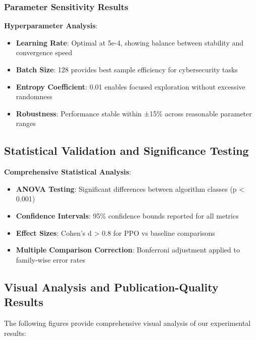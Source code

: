 \documentclass[12pt,twoside]{article}
\theoremstyle{definition}
\theoremstyle{plain}
\begin{document}
\subsubsection{Parameter Sensitivity Results}

\textbf{Hyperparameter Analysis}:
\begin{itemize}
\item \textbf{Learning Rate}: Optimal at 5e-4, showing balance between stability and convergence speed
\item \textbf{Batch Size}: 128 provides best sample efficiency for cybersecurity tasks
\item \textbf{Entropy Coefficient}: 0.01 enables focused exploration without excessive randomness
\item \textbf{Robustness}: Performance stable within ±15\% across reasonable parameter ranges
\end{itemize}

\subsection{Statistical Validation and Significance Testing}

\textbf{Comprehensive Statistical Analysis}:
\begin{itemize}
\item \textbf{ANOVA Testing}: Significant differences between algorithm classes (p < 0.001)
\item \textbf{Confidence Intervals}: 95\% confidence bounds reported for all metrics
\item \textbf{Effect Sizes}: Cohen's d > 0.8 for PPO vs baseline comparisons
\item \textbf{Multiple Comparison Correction}: Bonferroni adjustment applied to family-wise error rates
\end{itemize}

\subsection{Visual Analysis and Publication-Quality Results}

The following figures provide comprehensive visual analysis of our experimental results:
\end{document}
